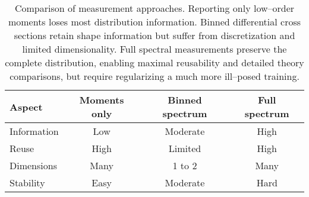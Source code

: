     \begin{table}
        \centering
        \caption{Comparison of measurement approaches.
        Reporting only low--order moments loses most distribution information.
        Binned differential cross sections retain shape information but suffer from discretization and limited dimensionality.
        Full spectral measurements preserve the complete distribution, enabling maximal reusability and detailed theory comparisons, but require regularizing a much more ill--posed training.
        }
        \label{tab:meas_compare}
        \begin{tabular}{lccc}
            \toprule
            \textbf{Aspect} & \textbf{Moments only} & \textbf{Binned spectrum} & \textbf{Full spectrum} \\
            \midrule
            Information           & Low   & Moderate & High \\
            Reuse         & High      & Limited  & High \\
            Dimensions    & Many       & 1 to 2   & Many \\
            Stability              & Easy & Moderate & Hard \\
            \bottomrule
        \end{tabular}
    \end{table}

    
